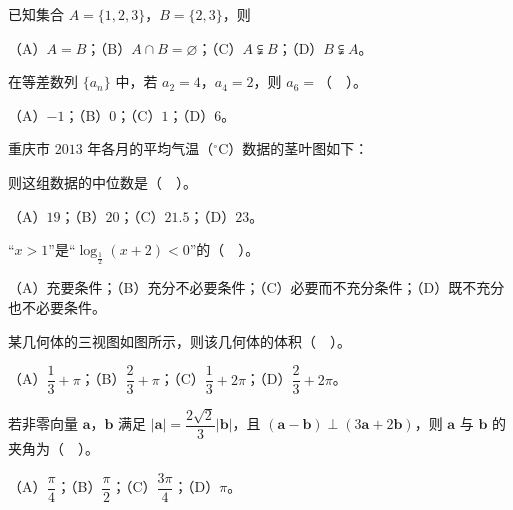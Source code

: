 \begin{question}
已知集合 $A=\{1,2,3\}$，$B=\{2,3\}$，则

（A）$A=B$；（B）$A\cap B=\varnothing$；（C）$A\subsetneqq B$；（D）$B\subsetneqq A$。

\end{question}
\begin{question}
在等差数列 $\{a_{n}\}$ 中，若 $a_{2}=4$，$a_{4}=2$，则 $a_{6}=$（　）。

（A）$-1$；（B）$0$；（C）$1$；（D）$6$。

\Needspace{0.4\textheight}
\end{question}
\begin{question}
重庆市 $2013$ 年各月的平均气温（$^\circ$C）数据的茎叶图如下：
\nopagebreak[4]
\begin{center}\end{center}
\nopagebreak[4]
则这组数据的中位数是（　）。

（A）$19$；（B）$20$；（C）$21.5$；（D）$23$。

\end{question}
\begin{question}
“$x>1$”是“$\log_{\frac{1}{2}}(x+2)<0$”的（　）。

（A）充要条件；（B）充分不必要条件；（C）必要而不充分条件；（D）既不充分也不必要条件。

\Needspace{0.4\textheight}
\end{question}
\begin{question}
某几何体的三视图如图所示，则该几何体的体积（　）。
\nopagebreak[4]
\begin{center}\end{center}
\nopagebreak[4]
（A）$\dfrac{1}{3}+\pi$；（B）$\dfrac{2}{3}+\pi$；（C）$\dfrac{1}{3}+2\pi$；（D）$\dfrac{2}{3}+2\pi$。

\end{question}
\begin{question}
若非零向量 $\boldsymbol{a}$，$\boldsymbol{b}$ 满足 $|\boldsymbol{a}|=\dfrac{2\sqrt{2}}{3}|\boldsymbol{b}|$，且 $(\boldsymbol{a}-\boldsymbol{b})\perp(3\boldsymbol{a}+2\boldsymbol{b})$，则 $\boldsymbol{a}$ 与 $\boldsymbol{b}$ 的夹角为（　）。

（A）$\dfrac{\pi}{4}$；（B）$\dfrac{\pi}{2}$；（C）$\dfrac{3\pi}{4}$；（D）$\pi$。

\Needspace{0.4\textheight}
\end{question}
